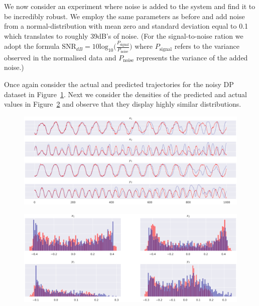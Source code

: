 We now consider an experiment where noise is added to the system and find it to be incredibly robust. We employ the same parameters as before and add noise from a normal-distribution with mean zero and standard deviation equal to 0.1 which translates to roughly 39dB's of noise.
(For the signal-to-noise ration we adopt the formula $\text{SNR}_{dB}=10\text{log}_{10}\big(\frac{P_\text{{signal}}}{P_{\text{noise}}}\big)$ where $P_\text{{signal}}$ refers to the variance observed in the normalised data and $P_{\text{noise}}$ represents the variance of the added noise.)

Once again consider the actual and predicted trajectories for the noisy DP dataset in Figure~\ref{fig:noisydp_success_traj}. Next we consider the densities of the predicted and actual values in Figure~\ref{fig:noisydp_success_density} and observe that they display highly similar distributions.

\begin{figure}[ht]
  \centering
  \includegraphics[width=0.95\linewidth]{Graphs/_dp_noise_FigCD_2030.eps} 
  \label{fig:noisydp_success_traj}
\end{figure}
\begin{figure}[ht]
  \centering
  \includegraphics[width=\linewidth]{Graphs/_dp_noise_2B_2030.eps}
  \label{fig:noisydp_success_density}
 \end{figure}

